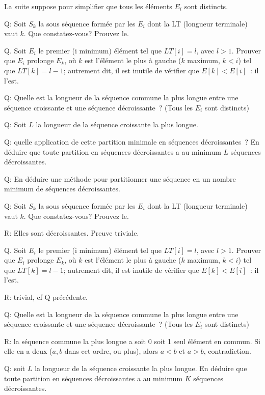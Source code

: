 \documentclass[a4paper]{article}
\begin{document}
La suite suppose pour simplifier que tous les \'el\'ements $E_i$ sont distincts.

Q: Soit $S_k$ la sous s\'equence form\'ee par les $E_i$ dont la LT (longueur terminale) vaut $k$. Que constatez-vous? Prouvez le.


Q. Soit $E_i$ le premier (i minimum) \'el\'ement tel que $LT[i]=l$, avec $l>1$.
Prouver que $E_i$ prolonge $E_k$, o\`u $k$ est l'\'el\'ement le plus \`a gauche ($k$ maximum, $k<i$) tel que $LT[k]=l-1$; autrement dit,
il est inutile de v\'erifier que $E[k] < E[i]$~: il l'est. 

Q: Quelle est la longueur de la s\'equence commune la plus longue entre une s\'equence croissante et une s\'equence d\'ecroissante~? (Tous les $E_i$ sont distincts)

Q: Soit $L$ la longueur de la s\'equence croissante la plus longue.

Q: quelle application de cette partition minimale en s\'equences d\'ecroissantes~?
En d\'eduire que toute partition en  s\'equences d\'ecroissantes a au minimum $L$ s\'equences d\'ecroissantes. 


Q: En d\'eduire une m\'ethode pour partitionner une s\'equence en un nombre minimum de s\'equences d\'ecroissantes.
\newpage

Q: Soit $S_k$ la sous s\'equence form\'ee par les $E_i$ dont la LT (longueur terminale) vaut $k$. Que constatez-vous? Prouvez le.

R: Elles sont d\'ecroissantes. Preuve triviale.


Q. Soit $E_i$ le premier (i minimum) \'el\'ement tel que $LT[i]=l$, avec $l>1$.
Prouver que $E_i$ prolonge $E_k$, o\`u $k$ est l'\'el\'ement le plus \`a gauche ($k$ maximum, $k<i$) tel que $LT[k]=l-1$; autrement dit,
il est inutile de v\'erifier que $E[k] < E[i]$~: il l'est. 

R: trivial, cf  Q pr\'ec\'edente.

Q: Quelle est la longueur de la s\'equence commune la plus longue entre une s\'equence croissante et une s\'equence d\'ecroissante~? (Tous les $E_i$ sont distincts)

R: la s\'equence commune la plus longue a soit 0 soit 1 seul \'el\'ement en commun. Si elle en a deux ($a, b$ dans cet ordre, ou plus), alors $a < b$  et $a > b$, contradiction.

Q: 
soit $L$ la longueur de la s\'equence croissante la plus longue.
En d\'eduire que toute partition en  s\'equences d\'ecroissantes a au minimum $K$ s\'equences d\'ecroissantes. 
\end{document}
